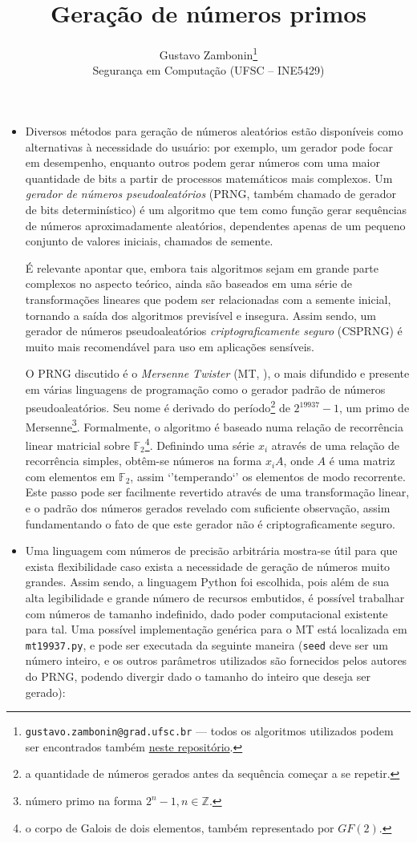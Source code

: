 \documentclass{article}
\title{\textbf{Geração de números primos}}
\author{Gustavo Zambonin\thanks{\texttt{gustavo.zambonin@grad.ufsc.br} ---
todos os algoritmos utilizados podem ser encontrados
também \href{https://github.com/zambonin/ufsc-ine5429}{neste repositório}.} \\
\small {Segurança em Computação (UFSC -- INE5429)} \vspace{-5mm}}
\date{}
\begin{document}
\maketitle

\begin{itemize}

\item Diversos métodos para geração de números aleatórios estão disponíveis
como alternativas à necessidade do usuário: por exemplo, um gerador pode focar
em desempenho, enquanto outros podem gerar números com uma maior quantidade de
bits a partir de processos matemáticos mais complexos. Um \emph{gerador de
números pseudoaleatórios} (PRNG, também chamado de gerador de bits
determinístico) é um algoritmo que tem como função gerar sequências de números
aproximadamente aleatórios, dependentes apenas de um pequeno conjunto de
valores iniciais, chamados de semente.

É relevante apontar que, embora tais algoritmos sejam em grande parte
complexos no aspecto teórico, ainda são baseados em uma série de
transformações lineares que podem ser relacionadas com a semente inicial,
tornando a saída dos algoritmos previsível e insegura. Assim sendo, um gerador
de números pseudoaleatórios \emph{criptograficamente seguro} (CSPRNG) é muito
mais recomendável para uso em aplicações sensíveis.

O PRNG discutido é o \emph{Mersenne Twister} (MT,
\cite{Matsumoto:1998:MTE:272991.272995}), o mais difundido e presente em
várias linguagens de programação como o gerador padrão de números
pseudoaleatórios. Seu nome é derivado do período\footnote{a quantidade de
números gerados antes da sequência começar a se repetir.} de $2^{19937} - 1$,
um primo de Mersenne\footnote{número primo na forma $2^n - 1, n \in
\mathbb{Z}$.}. Formalmente, o algoritmo é baseado numa relação de recorrência
linear matricial sobre $\mathbb{F}_2$\footnote{o corpo de Galois de dois
elementos, também representado por $GF(2)$.}. Definindo uma série $x_i$
através de uma relação de recorrência simples, obtêm-se números na forma $x_i
A$, onde $A$ é uma matriz com elementos em $\mathbb{F}_2$, assim
`'temperando`' os elementos de modo recorrente. Este passo pode ser facilmente
revertido através de uma transformação linear, e o padrão dos números gerados
revelado com suficiente observação, assim fundamentando o fato de que este
gerador não é criptograficamente seguro.

\item Uma linguagem com números de precisão arbitrária mostra-se útil para que
exista flexibilidade caso exista a necessidade de geração de números muito
grandes. Assim sendo, a linguagem Python foi escolhida, pois além de sua alta
legibilidade e grande número de recursos embutidos, é possível trabalhar com
números de tamanho indefinido, dado poder computacional existente para tal.
Uma possível implementação genérica para o MT está localizada em
\verb!mt19937.py!, e pode ser executada da seguinte maneira (\verb!seed! deve
ser um número inteiro, e os outros parâmetros utilizados são fornecidos pelos
autores do PRNG, podendo divergir dado o tamanho do inteiro que deseja ser
gerado):


\end{itemize}
\end{document}
